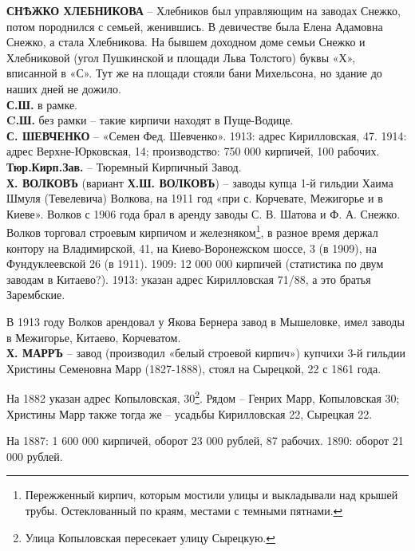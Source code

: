 \noindent\textbf{СНѢЖКО ХЛЕБНИКОВА} – Хлебников был управляющим на заводах Снежко, потом породнился с семьей, женившись. В девичестве была Елена Адамовна Снежко, а стала Хлебникова. На бывшем доходном доме семьи Снежко и Хлебниковой (угол Пушкинской и площади Льва Толстого) буквы «Х», вписанной в «С». Тут же на площади стояли бани Михельсона, но здание до наших дней не дожило.\\ 

\noindent\textbf{С.Ш.} в рамке.\\

\noindent\textbf{C.Ш.} без рамки – такие кирпичи находят в Пуще-Водице.\\

\noindent\textbf{С. ШЕВЧЕНКО} – «Семен Фед. Шевченко». 1913: адрес Кирилловская, 47. 1914: адрес Верхне-Юрковская, 14; производство: 750 000 кирпичей, 100 рабочих.\\

\noindent\textbf{Тюр.Кирп.Зав.} – Тюремный Кирпичный Завод.\\

\noindent\textbf{Х. ВОЛКОВЪ} (вариант \textbf{Х.Ш. ВОЛКОВЪ}) – заводы купца 1-й гильдии Хаима Шмуля (Тевелевича) Волкова, на 1911 год «при  с. Корчевате, Межигорье и в Киеве». Волков с 1906 года брал в аренду заводы С. В. Шатова и Ф. А. Снежко. Волков торговал строевым кирпичом и железняком\footnote{Пережженный кирпич, которым мостили улицы и выкладывали над крышей трубы. Остеклованный по краям, местами с темными пятнами.}, в разное время держал контору на Владимирской, 41, на Киево-Воронежском шоссе, 3 (в 1909), на Фундуклеевской 26 (в 1911). 1909: 12 000 000 кирпичей (статистика по двум заводам в Китаево?). 1913: указан адрес Кирилловская 71/88, а это братья Зарембские. 

В 1913 году Волков арендовал у Якова Бернера завод в Мышеловке, имел заводы в Межигорье, Китаево, Корчеватом.\\

\noindent\textbf{Х. МАРРЪ} – завод (производил «белый строевой кирпич») купчихи 3-й гильдии Христины Семеновна Марр (1827-1888), стоял на Сырецкой, 22 с 1861 года. 

На 1882 указан адрес Копыловская, 30\footnote{Улица Копыловская пересекает улицу Сырецкую.}. Рядом – Генрих Марр, Копыловская 30; Христины Марр также тогда же – усадьбы Кирилловская 22, Сырецкая 22. 

На 1887: 1 600 000 кирпичей, оборот 23 000 рублей, 87 рабочих. 1890: оборот 21 000 рублей.

